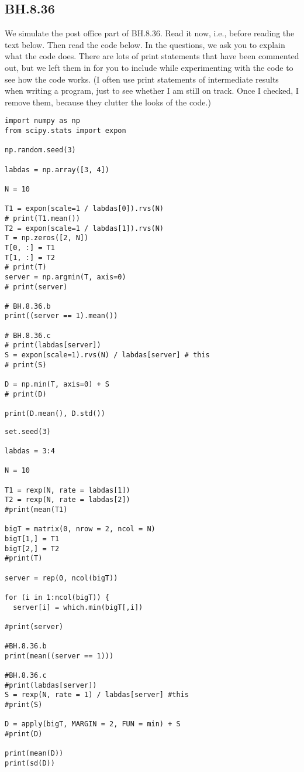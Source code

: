 \subsection{BH.8.36}
\label{sec:bh.8.36}

We simulate the post office part of BH.8.36.
Read it now, i.e., before reading the text below.
Then read the code below.
In the questions, we ask you to explain what the code does.
There are lots of print statements that have been commented out, but we left them in for you to include while experimenting with the code to see how the code works.
(I often use print statements of intermediate results when writing a program, just to see whether I am still on track.
Once I checked, I remove them, because they clutter the looks of the code.)

\begin{verbatim}
import numpy as np
from scipy.stats import expon

np.random.seed(3)

labdas = np.array([3, 4])

N = 10

T1 = expon(scale=1 / labdas[0]).rvs(N)
# print(T1.mean())
T2 = expon(scale=1 / labdas[1]).rvs(N)
T = np.zeros([2, N])
T[0, :] = T1
T[1, :] = T2
# print(T)
server = np.argmin(T, axis=0)
# print(server)

# BH.8.36.b
print((server == 1).mean())

# BH.8.36.c
# print(labdas[server])
S = expon(scale=1).rvs(N) / labdas[server] # this
# print(S)

D = np.min(T, axis=0) + S
# print(D)

print(D.mean(), D.std())
\end{verbatim}

\begin{verbatim}
set.seed(3)

labdas = 3:4

N = 10

T1 = rexp(N, rate = labdas[1])
T2 = rexp(N, rate = labdas[2])
#print(mean(T1)

bigT = matrix(0, nrow = 2, ncol = N)
bigT[1,] = T1
bigT[2,] = T2
#print(T)

server = rep(0, ncol(bigT))

for (i in 1:ncol(bigT)) {
  server[i] = which.min(bigT[,i])

#print(server)

#BH.8.36.b
print(mean((server == 1)))

#BH.8.36.c
#print(labdas[server])
S = rexp(N, rate = 1) / labdas[server] #this
#print(S)

D = apply(bigT, MARGIN = 2, FUN = min) + S
#print(D)

print(mean(D))
print(sd(D))
\end{verbatim}

